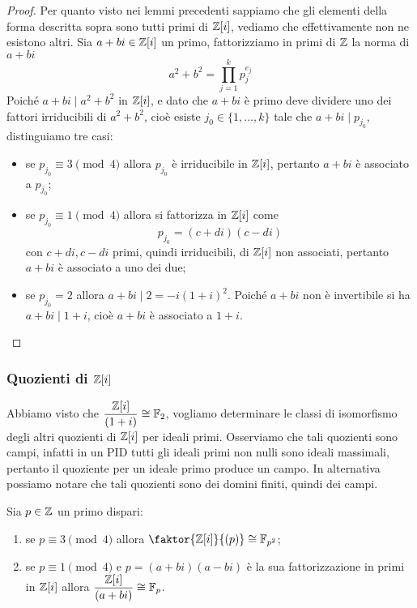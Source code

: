 \documentclass[11pt]{scrartcl}
\begin{document}
\begin{proof}
    Per quanto visto nei lemmi precedenti sappiamo che gli elementi della forma
    descritta sopra sono tutti primi di $\mathbb Z[i]$, vediamo che effettivamente
    non ne esistono altri.\newline
    Sia $a + bi \in \mathbb Z[i]$ un primo, fattorizziamo in primi di $\mathbb Z$ la norma 
    di $a + bi$
    \[
        a^2 + b^2 = \prod_{j = 1}^k p_j^{e_j}
    \]
    Poiché $a + bi \mid a^2 + b^2$ in $\mathbb Z[i]$, e dato che $a + bi$ è primo deve dividere uno dei fattori irriducibili di $a^2 + b^2$,  
    cioè esiste $j_0 \in \{1, \ldots, k\}$ tale che $a + bi \mid p_{j_0}$, distinguiamo tre casi:
    \begin{itemize}
        \item se $p_{j_0}\equiv 3 \pmod 4$ allora $p_{j_0}$ è irriducibile in 
        $\mathbb Z[i]$, pertanto $a + bi$ è associato a $p_{j_0}$;
        \item se $p_{j_0} \equiv 1 \pmod 4$ allora si fattorizza in $\mathbb Z[i]$ come 
        \[
              p_{j_0} = (c + di)(c - di)
        \]
        con $c + di, c - di$ primi, quindi irriducibili, di $\mathbb Z[i]$ non 
        associati, pertanto $a + bi$ è associato a uno dei due;
        \item se $p_{j_0} = 2$ allora $a + bi \mid 2 = -i(1 + i)^2$. Poiché $a + bi$
        non è invertibile si ha $a + bi \mid 1 + i$, cioè $a + bi$ è 
        associato a $1 + i$.
    \end{itemize}
\end{proof}


\subsubsection{Quozienti di $\mathbb Z[i]$}

Abbiamo visto che $\displaystyle\frac{\mathbb Z[i]}{(1 + i)} \cong \mathbb F_2$, vogliamo
determinare le classi di isomorfismo degli altri quozienti di $\mathbb Z[i]$ per 
ideali primi. Osserviamo che tali quozienti sono campi, infatti in un PID tutti 
gli ideali primi non nulli sono ideali massimali, pertanto il quoziente per 
un ideale primo produce un campo. In alternativa possiamo notare che tali
quozienti sono dei domini finiti, quindi dei campi.

\begin{proposition}
    Sia $p \in \mathbb Z$ un primo dispari:
    \begin{enumerate}[(1)]
        \item se $p \equiv 3 \pmod 4$ allora $\faktor{\ZZ[i]}{(p)}
        \cong \FF_{p^2}$;
        \item se $p \equiv 1 \pmod 4$ e $p = (a + bi)(a - bi)$ è la sua 
        fattorizzazione in primi in $\mathbb Z[i]$ allora $\displaystyle\frac{\mathbb Z[i]}{(a + bi)}
        \cong \mathbb F_p$.
    \end{enumerate}
\end{proposition}
\end{document}
